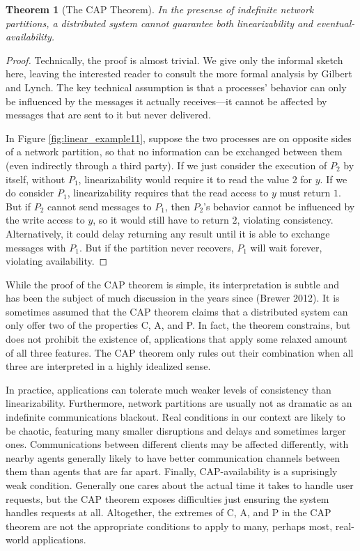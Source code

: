 \documentclass[]             %
{NASA}                       %
\newtheorem{theorem}{Theorem}[section]
\theoremstyle{definition}
\begin{document}
\begin{theorem}[The CAP Theorem]
    \label{thm:cap}
    In the presense of indefinite network partitions, a distributed system
    cannot guarantee both linearizability and eventual-availability.
\end{theorem}
\begin{proof}
Technically, the proof is almost trivial. We give only the informal
sketch here, leaving the interested reader to consult the more formal
analysis by Gilbert and Lynch. The key technical assumption is that a
processes' behavior can only be influenced by the messages it actually
receives---it cannot be affected by messages that are sent to it but
never delivered.

In Figure \ref{fig:linear_example11}, suppose the two processes are on
opposite sides of a network partition, so that no information can be
exchanged between them (even indirectly through a third party). If we
just consider the execution of $P_2$ by itself, without $P_1$,
linearizability would require it to read the value $2$ for $y$. If we
do consider $P_1$, linearizability requires that the read access to
$y$ must return $1$. But if $P_2$ cannot send messages to $P_1$, then
$P_2$'s behavior cannot be influenced by the write access to $y$, so
it would still have to return $2$, violating
consistency. Alternatively, it could delay returning any result until
it is able to exchange messages with $P_1$. But if the partition never
recovers, $P_1$ will wait forever, violating availability.
\end{proof}

While the proof of the CAP theorem is simple, its interpretation is
subtle and has been the subject of much discussion in the years since
(Brewer 2012). It is sometimes assumed that the CAP theorem claims that
a distributed system can only offer two of the properties C, A, and P.
In fact, the theorem constrains, but does not prohibit the existence of,
applications that apply some relaxed amount of all three features. The
CAP theorem only rules out their combination when all three are
interpreted in a highly idealized sense.

In practice, applications can tolerate much weaker levels of consistency
than linearizability. Furthermore, network partitions are usually not as
dramatic as an indefinite communications blackout. Real conditions in
our context are likely to be chaotic, featuring many smaller disruptions
and delays and sometimes larger ones. Communications between different
clients may be affected differently, with nearby agents generally likely
to have better communication channels between them than agents that are
far apart. Finally, CAP-availability is a suprisingly weak condition.
Generally one cares about the actual time it takes to handle user
requests, but the CAP theorem exposes difficulties just ensuring the
system handles requests at all. Altogether, the extremes of C, A, and P
in the CAP theorem are not the appropriate conditions to apply to many,
perhaps most, real-world applications.
\end{document}
